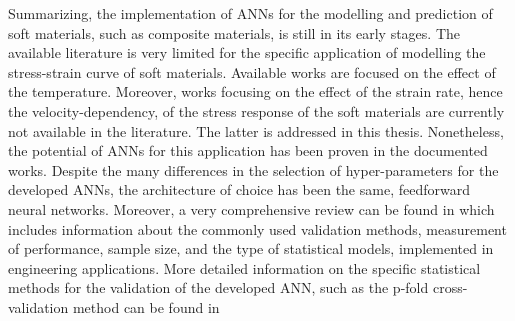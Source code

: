 Summarizing, the implementation of ANNs for the modelling and prediction of soft materials, such as composite materials, is still in its early stages. The available literature is very limited for the specific application of modelling the stress-strain curve of soft materials. Available works are focused on the effect of the temperature. Moreover, works focusing on the effect of the strain rate, hence the velocity-dependency, of the stress response of the soft materials are currently not available in the literature. The latter is addressed in this thesis. Nonetheless, the potential of ANNs for this application has been proven in the documented works. Despite the many differences in the selection of hyper-parameters for the developed ANNs, the architecture of choice has been the same, feedforward neural networks. Moreover, a very comprehensive review can be found in \cite{paliwal2009neural} which includes information about the commonly used validation methods, measurement of performance, sample size, and the type of statistical models, implemented in engineering applications. More detailed information on the specific statistical methods for the validation of the developed ANN, such as the p-fold cross-validation method can be found in \cite{wang2007review,koskela2003neural}





